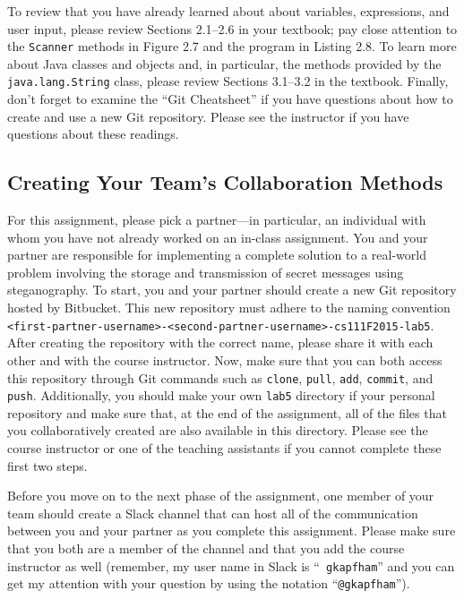 To review that you have already learned about about variables, expressions, and user input, please review Sections
2.1--2.6 in your textbook; pay close attention to the {\tt Scanner} methods in Figure 2.7 and the program in Listing
2.8. To learn more about Java classes and objects and, in particular, the methods provided by the {\tt java.lang.String}
class, please review Sections 3.1--3.2 in the textbook. Finally, don't forget to examine the ``Git Cheatsheet'' if you
have questions about how to create and use a new Git repository. Please see the instructor if you have questions
about these readings.

\vspace{-0.05in}
\subsection*{Creating Your Team's Collaboration Methods}
\vspace{-0.05in}

For this assignment, please pick a partner---in particular, an individual with whom you have not already worked on an
in-class assignment. You and your partner are responsible for implementing a complete solution to a real-world problem
involving the storage and transmission of secret messages using steganography. To start, you and your partner should
create a new Git repository hosted by Bitbucket. This new repository must adhere to the naming convention {\tt
<first-partner-username>-<second-partner-username>-cs111F2015-lab5}. After creating the repository with the correct
name, please share it with each other and with the course instructor. Now, make sure that you can both access this
repository through Git commands such as {\tt clone}, {\tt pull}, {\tt add}, {\tt commit}, and {\tt push}. Additionally,
you should make your own {\tt lab5} directory if your personal repository and make sure that, at the end of the
assignment, all of the files that you collaboratively created are also available in this directory. Please see the
course instructor or one of the teaching assistants if you cannot complete these first two steps.

Before you move on to the next phase of the assignment, one member of your team should create a Slack channel that can
host all of the communication between you and your partner as you complete this assignment. Please make sure that you
both are a member of the channel and that you add the course instructor as well (remember, my user name in Slack is ``{\tt
gkapfham}'' and you can get my attention with your question by using the notation ``{\tt @gkapfham}'').

